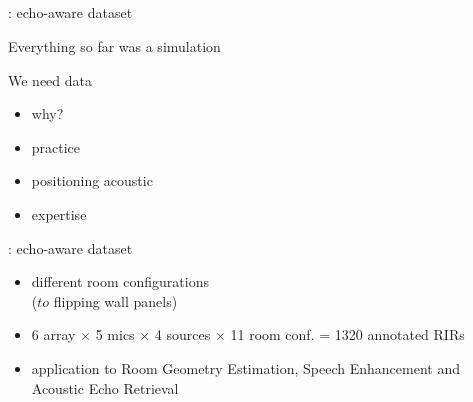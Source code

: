 \subsection{\dechorate}

\begin{frame}{\dechorate: echo-aware dataset  \hfill\faTint}

    \alert{\iconAlert Everything so far was a simulation}

    \begin{mysotablock}{We need data}
        \begin{itemize}
            \item why?
            \item practice
            \item positioning acoustic
            \item expertise
        \end{itemize}

    \end{mysotablock}

    \begin{mycontriblock}{\dechorate: echo-aware dataset}
        \begin{itemize}
            \item different room configurations
            \\($to$ flipping wall panels)
            \item 6 array $\times$ 5 mics $\times$ 4 sources $\times$ 11 room conf. = 1320 annotated RIRs
            \item application to Room Geometry Estimation, Speech Enhancement and Acoustic Echo Retrieval
        \end{itemize}
    \hfill {\small {}}
    \end{mycontriblock}



\end{frame}
